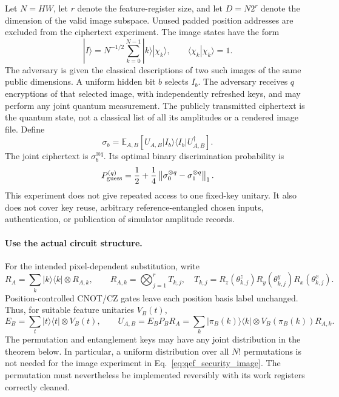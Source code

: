 \documentclass[11pt,a4paper]{article}
\begin{document}
{Let $N=HW$, let $r$ denote the feature-register size, and let
$D=N2^r$ denote the dimension of the valid image subspace. Unused padded
position addresses are excluded from the ciphertext experiment. The image
states have the form
\begin{equation}
\label{eq:qef_security_image}
 |I\rangle=N^{-1/2}\sum_{k=0}^{N-1}|k\rangle|\chi_k\rangle,
 \qquad \langle\chi_k|\chi_k\rangle=1.
\end{equation}
The adversary is given the classical descriptions of two such images of
the same public dimensions. A uniform hidden bit $b$ selects $I_b$.
The adversary receives $q$ encryptions of that selected image, with
independently refreshed keys, and may perform any joint quantum
measurement. The publicly transmitted ciphertext is the quantum state,
not a classical list of all its amplitudes or a rendered image file.
Define
\begin{equation}
\label{eq:qef_averaged_cipher}
 \sigma_b=\mathbb E_{A,B}
   [U_{A,B}|I_b\rangle\langle I_b|U_{A,B}^{\dagger}].
\end{equation}
The joint ciphertext is $\sigma_b^{\otimes q}$. Its optimal binary
discrimination probability is \cite{Watrous2018QEF}
\begin{equation}
\label{eq:qef_operational_guess}
 P_{\rm guess}^{(q)}
 =\frac12+\frac14\left\|
       \sigma_0^{\otimes q}-\sigma_1^{\otimes q}\right\|_1.
\end{equation}
This experiment does not give repeated access to one fixed-key unitary.
It also does not cover key reuse, arbitrary reference-entangled chosen
inputs, authentication, or publication of simulator amplitude records.

\paragraph{Use the actual circuit structure.}
For the intended pixel-dependent substitution, write
\begin{equation}
 R_A=\sum_k |k\rangle\langle k|\otimes R_{A,k},\qquad
 R_{A,k}=\bigotimes_{j=1}^r T_{k,j},\quad
 T_{k,j}=R_z(\theta_{k,j}^z)R_y(\theta_{k,j}^y)R_x(\theta_{k,j}^x).
\end{equation}
Position-controlled CNOT/CZ gates leave each position basis label
unchanged. Thus, for suitable feature unitaries $V_B(t)$,
\begin{equation}
 E_B=\sum_t |t\rangle\langle t|\otimes V_B(t),\qquad
 U_{A,B}=E_BP_BR_A
 =\sum_k |\pi_B(k)\rangle\langle k|
       \otimes V_B(\pi_B(k))R_{A,k}.
\end{equation}
The permutation and entanglement keys may have any joint distribution
in the theorem below. In particular, a uniform distribution over all
$N!$ permutations is not needed for the image experiment in
Eq.~\eqref{eq:qef_security_image}. The permutation must nevertheless be
implemented reversibly with its work registers correctly cleaned.

}
\end{document}
